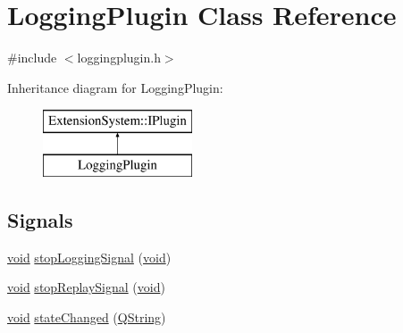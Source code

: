 \hypertarget{class_logging_plugin}{\section{\-Logging\-Plugin \-Class \-Reference}
\label{class_logging_plugin}
}


{\ttfamily \#include $<$loggingplugin.\-h$>$}

\-Inheritance diagram for \-Logging\-Plugin\-:\begin{figure}[H]
\begin{center}
\leavevmode
\includegraphics[height=2.000000cm]{class_logging_plugin}
\end{center}
\end{figure}
\subsection*{\-Signals}
\begin{DoxyCompactItemize}
\item 
\hyperlink{group___u_a_v_objects_plugin_ga444cf2ff3f0ecbe028adce838d373f5c}{void} \hyperlink{class_logging_plugin_a98a1e57b1e2f83725350e1ef0058e99e}{stop\-Logging\-Signal} (\hyperlink{group___u_a_v_objects_plugin_ga444cf2ff3f0ecbe028adce838d373f5c}{void})
\item 
\hyperlink{group___u_a_v_objects_plugin_ga444cf2ff3f0ecbe028adce838d373f5c}{void} \hyperlink{class_logging_plugin_ae099cf3698d490ea9b3484f0fa9ce339}{stop\-Replay\-Signal} (\hyperlink{group___u_a_v_objects_plugin_ga444cf2ff3f0ecbe028adce838d373f5c}{void})
\item 
\hyperlink{group___u_a_v_objects_plugin_ga444cf2ff3f0ecbe028adce838d373f5c}{void} \hyperlink{class_logging_plugin_a48a1e9450ef2427e4b0da0d6566cc711}{state\-Changed} (\hyperlink{group___u_a_v_objects_plugin_gab9d252f49c333c94a72f97ce3105a32d}{\-Q\-String})
\end{DoxyCompactItemize}
